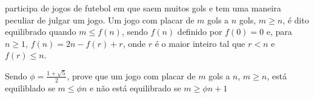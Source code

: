  participa de jogos de futebol em que saem muitos gols e tem uma maneira peculiar de julgar um jogo.
Um jogo com placar de $m$ gols a $n$ gols, $m \ge n$, é dito equilibrado quando $m \le f(n)$, sendo $f(n)$ definido por $f(0) = 0$ e, para $n \ge 1$, $f(n) = 2n - f(r) + r$, onde $r$ é o maior inteiro tal que $r < n$ e $f(r) \le n$.

Sendo $\phi = \frac{1+\sqrt{5}}{2}$, prove que um jogo com placar de $m$ gols a $n$, $m\ge n$, está equiliblado se $m \le \phi n$ e não está equilibrado se $m \ge \phi n + 1$